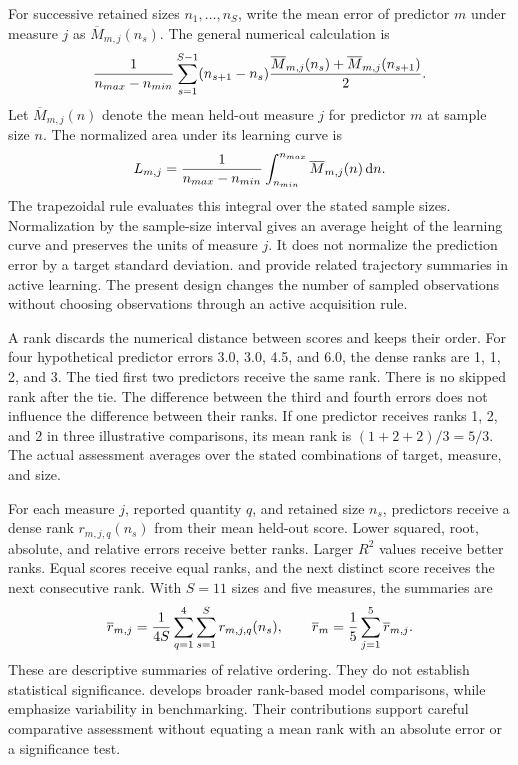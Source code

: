 For successive retained sizes \(n_1,\ldots,n_S\), write the mean error of predictor \(m\) under measure \(j\) as \(\overline M_{m,j}(n_s)\). The general numerical calculation is
\begin{equation}
\equationname{Trapezoidal approximation of normalized learning-curve area}
\label{eq:icsor_learning_area_trapezoids}
\frac{1}{n_{max}-n_{min}}
\sum_{s=1}^{S-1}(n_{s+1}-n_s)
\frac{\overline M_{m,j}(n_s)+\overline M_{m,j}(n_{s+1})}{2}.
\end{equation}
Let \(\overline M_{m,j}(n)\) denote the mean held-out measure \(j\) for predictor \(m\) at sample size \(n\). The normalized area under its learning curve is
\begin{equation}
\equationname{Integral definition of normalized learning-curve area}
\label{eq:icsor_learning_area}
L_{m,j}=\frac{1}{n_{max}-n_{min}}
\int_{n_{min}}^{n_{max}}\overline M_{m,j}(n)\,\mathrm{d}n.
\end{equation}
The trapezoidal rule evaluates this integral over the stated sample sizes. Normalization by the sample-size interval gives an average height of the learning curve and preserves the units of measure \(j\). It does not normalize the prediction error by a target standard deviation. \citet{Cawley2011} and \citet{Guyon2011} provide related trajectory summaries in active learning. The present design changes the number of sampled observations without choosing observations through an active acquisition rule.

A rank discards the numerical distance between scores and keeps their order. For four hypothetical predictor errors 3.0, 3.0, 4.5, and 6.0, the dense ranks are 1, 1, 2, and 3. The tied first two predictors receive the same rank. There is no skipped rank after the tie. The difference between the third and fourth errors does not influence the difference between their ranks. If one predictor receives ranks 1, 2, and 2 in three illustrative comparisons, its mean rank is \((1+2+2)/3=5/3\). The actual assessment averages over the stated combinations of target, measure, and size.

For each measure \(j\), reported quantity \(q\), and retained size \(n_s\), predictors receive a dense rank \(r_{m,j,q}(n_s)\) from their mean held-out score. Lower squared, root, absolute, and relative errors receive better ranks. Larger \(R^2\) values receive better ranks. Equal scores receive equal ranks, and the next distinct score receives the next consecutive rank. With \(S=11\) sizes and five measures, the summaries are
\begin{equation}
\equationname{Mean dense ranks over quantities, measures, and sample sizes}
\label{eq:icsor_dense_rank}
\overline r_{m,j}=\frac{1}{4S}\sum_{q=1}^{4}\sum_{s=1}^{S}r_{m,j,q}(n_s),
\qquad
\overline r_m=\frac{1}{5}\sum_{j=1}^{5}\overline r_{m,j}.
\end{equation}
These are descriptive summaries of relative ordering. They do not establish statistical significance. \citet{Demsar2006} develops broader rank-based model comparisons, while \citet{Shevchenko2024} emphasize variability in benchmarking. Their contributions support careful comparative assessment without equating a mean rank with an absolute error or a significance test.

